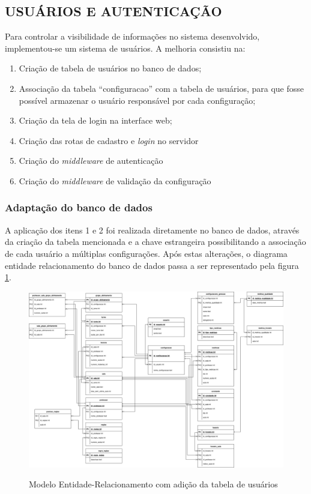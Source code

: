 \subsection{USUÁRIOS E AUTENTICAÇÃO}

Para controlar a visibilidade de informações no sistema desenvolvido, implementou-se um sistema de usuários. A melhoria consistiu na:

\begin{enumerate}
	\item Criação de tabela de usuários no banco de dados;
	\item Associação da tabela ``configuracao'' com a tabela de usuários, para que fosse possível armazenar o usuário responsável por cada configuração;
	\item Criação da tela de login na interface web;
	\item Criação das rotas de cadastro e \textit{login} no servidor
	\item Criação do \textit{middleware} de autenticação
	\item Criação do \textit{middleware} de validação da configuração
\end{enumerate}

\subsubsection{Adaptação do banco de dados}
A aplicação dos itens 1 e 2 foi realizada diretamente no banco de dados, através da criação da tabela mencionada e a chave estrangeira possibilitando a associação de cada usuário a múltiplas configurações. Após estas alterações, o diagrama entidade relacionamento do banco de dados passa a ser representado pela figura \ref{fig:er_atualizado}.

\begin{figure}[!htb]
	\centering
	\caption{Modelo Entidade-Relacionamento com adição da tabela de usuários}
	\includegraphics[width=1\textwidth]{./dados/figuras/ER_horario_INCREMENTO5}
	\label{fig:er_atualizado}
\end{figure}

